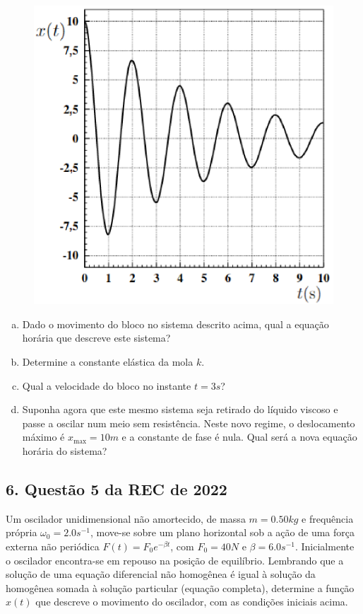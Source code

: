\documentclass[a4paper,10pt]{article}
\begin{document}
\begin{figure}[H]
\centering
\includegraphics[width=0.8\linewidth]{fig/grafico_sub}
\label{fig:grafico_sub}
\end{figure}

\begin{enumerate}[(a)]
\item Dado o movimento do bloco no sistema descrito acima, qual a equação horária que
descreve este sistema?

\item Determine a constante elástica da mola $k$.

\item Qual a velocidade do bloco no instante $t = 3 \unit{s}$?

\item Suponha agora que este mesmo sistema seja retirado do líquido viscoso e passe a
oscilar num meio sem resistência. Neste novo regime, o deslocamento máximo é $x_{\text{max}}=10 \unit{m}$ e a
constante de fase é nula. Qual será a nova equação horária do sistema?
\end{enumerate}

\n

\subsection*{6. Questão 5 da REC de 2022}

Um oscilador unidimensional não amortecido, de massa $m = 0.50 \unit{kg}$ e frequência
própria $\omega_0 = 2.0 \unit{s^{-1}}$, move-se sobre um plano horizontal sob a ação de uma força externa não
periódica $F(t) = F_0 e^{-\beta t}$, com $F_0 = 40 \unit{N}$ e $\beta = 6.0 \unit{s^{-1}}$. Inicialmente o oscilador
encontra-se em repouso na posição de equilíbrio. Lembrando que a solução de uma equação diferencial não homogênea
é igual à solução da homogênea somada à solução particular (equação completa), determine a função
$x(t)$ que descreve o movimento do oscilador, com as condições iniciais acima.
\end{document}
